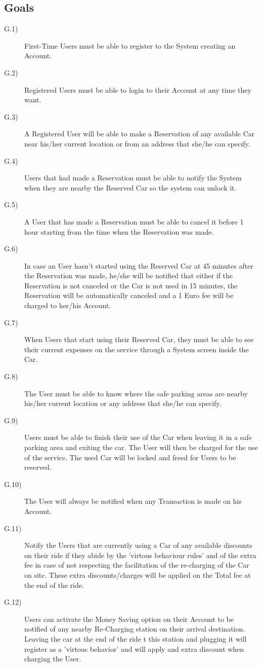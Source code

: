 \documentclass[a4paper]{article}
\begin{document}
\subsection{Goals}
\begin{description}
\item [G.1)]First-Time Users must be able to register to the System creating an Account. 
\item [G.2)]Registered Users must be able to login to their Account at any time they want.
\item [G.3)]A Registered User will be able to make a Reservation of any available Car near his/her current location or from an address that she/he can specify.
\item [G.4)]Users that had made a Reservation must be able to notify the System when they are nearby the Reserved Car so the system can unlock it.
\item [G.5)]A User that has made a Reservation must be able to cancel it before 1 hour starting from the time when the Reservation was made.
\item [G.6)]In case an User hasn't started using the Reserved Car at 45 minutes after the Reservation was made, he/she will be notified that either if the Reservation is not canceled or the Car is not used in 15 minutes, the Reservation will be automatically canceled and a 1 Euro fee will be charged to her/his Account.
\item [G.7)]When Users that start using their Reserved Car, they must be able to see their current expenses on the service through a System screen inside the Car.
\item [G.8)]The User must be able to know where the safe parking areas are nearby his/her current location or any address that she/he can specify.
\item [G.9)]Users must be able to finish their use of the Car when leaving it in a safe parking area and exiting the car. The User will then be charged for the use of the service. The used Car will be locked and freed for Users to be reserved.
\item [G.10)]The User will always be notified when any Transaction is made on his Account.
\item [G.11)]Notify the Users that are currently using a Car of any available discounts on their ride if they abide by the 'virtous behaviour rules' and of the extra fee in case of not respecting the facilitation of the re-charging of the Car on site. These extra discounts/charges will be applied on the Total fee at the end of the ride.
\item [G.12)]Users can activate the Money Saving option on their Account to be notified of any nearby Re-Charging station on their arrival destination. Leaving the car at the end of the ride t this station and plugging it will register as a 'virtous behavior' and will apply and extra discount when charging the User.
\end{description}
\end{document}
